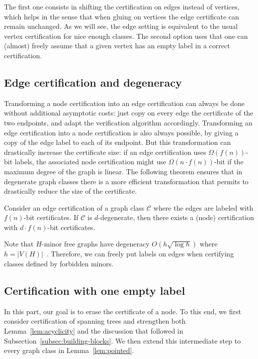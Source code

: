 \documentclass[a4paper,thm-restate,USenglish]{lipics-v2019}
\begin{document}
The first one consists in shifting the certification on edges instead of vertices, which helps in the sense that when gluing on vertices the edge certificate can remain unchanged. 
As we will see, the edge setting is equivalent to the usual vertex certification for nice enough classes. The second option uses that one can (almost) freely assume that a given vertex has an empty label in a correct certification.


\subsection{Edge certification and degeneracy}
\label{subsec:edge-certification}
Transforming a node certification into an edge certification can always be done without additional asymptotic costs: just copy on every edge the certificate of the two endpoints, and adapt the verification algorithm accordingly.
Transforming an edge certification into a node certification is also always possible, by giving a copy of the edge label to each of its endpoint. 
But this transformation can drastically increase the certificate size: if an edge certification uses $\Omega(f(n))$-bit labels, the associated node certification might use $\Omega(n \cdot f(n))$-bit  if the maximum degree of the graph is linear.
The following theorem ensures that in degenerate graph classes there is a more efficient transformation that permits to drastically reduce the size of the certificate.

\begin{theorem}\label{thm:degeneracy}
Consider an edge certification of a graph class $\mathcal{C}$ where the edges are labeled with $f(n)$-bit certificates. 
If $\mathcal{C}$ is $d$-degenerate, then there exists a (node) certification with $d\cdot f(n)$-bit certificates.
\end{theorem}

Note that $H$-minor free graphs have degeneracy $O(h \sqrt{\log h})$ where $h=|V(H)|$~\cite{kostochka1982minimum,thomason84}. Therefore, we can freely put labels on edges when certifying classes defined by forbidden minors.

\subsection{Certification with one empty label}


In this part, our goal is to erase the certificate of a node. To this end, we first consider certification of spanning trees and strengthen both Lemma~\ref{lem:acyclicity} and the discussion that followed in Subsection~\ref{subsec:building-blocks}. We then extend this intermediate step to every graph class in Lemma~\ref{lem:pointed}.
\end{document}
